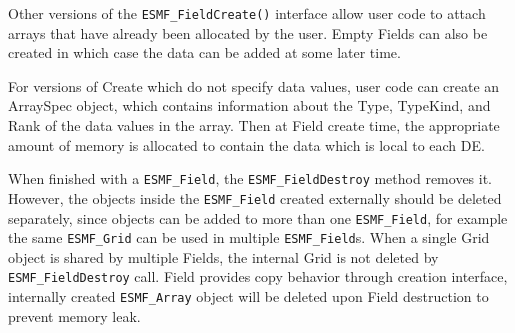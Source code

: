 Other versions of the {\tt ESMF\_FieldCreate()} interface
allow user code to attach arrays that have already been
allocated by the user.  Empty Fields can also be created in
which case the data can be added at some later time.

For versions of Create which do not specify data values,
user code can create an ArraySpec object, which
contains information about the Type, TypeKind, and Rank of the
data values in the array.  Then at Field create time, the
appropriate amount of memory is allocated to contain the
data which is local to each DE.

When finished with a {\tt ESMF\_Field}, the {\tt ESMF\_FieldDestroy} method
removes it.  However, the objects inside the {\tt ESMF\_Field}
created externally should be deleted separately, 
since objects can be added to
more than one {\tt ESMF\_Field}, for example the same {\tt ESMF\_Grid}
can be used in multiple {\tt ESMF\_Field}s.  When a single Grid object
is shared by multiple Fields, the internal Grid is not deleted by
{\tt ESMF\_FieldDestroy} call. Field provides copy behavior through creation 
interface, internally created {\tt ESMF\_Array} object
will be deleted upon Field destruction to prevent memory leak.
